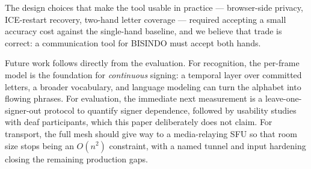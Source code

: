 \documentclass{llncs}
\begin{document}
The design choices that make the tool usable in practice ---
browser-side privacy, ICE-restart recovery, two-hand letter coverage ---
required accepting a small accuracy cost against the single-hand
baseline, and we believe that trade is correct: a communication tool for
BISINDO must accept both hands.

Future work follows directly from the evaluation. For recognition, the
per-frame model is the foundation for \emph{continuous} signing: a
temporal layer over committed letters, a broader vocabulary, and
language modeling can turn the alphabet into flowing phrases. For
evaluation, the immediate next measurement is a leave-one-signer-out
protocol to quantify signer dependence, followed by usability studies
with deaf participants, which this paper deliberately does not claim.
For transport, the full mesh should give way to a media-relaying SFU so
that room size stops being an $O(n^2)$ constraint, with a named tunnel
and input hardening closing the remaining production gaps.
\end{document}
